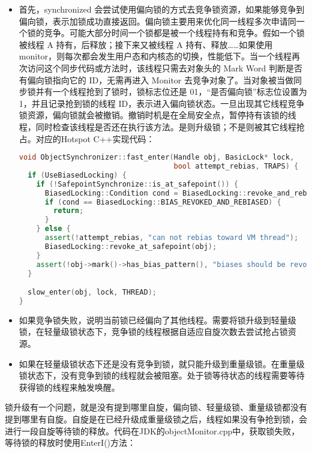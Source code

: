 \documentclass[../../../interview-questions.tex]{subfiles}
\begin{document}
\begin{itemize}
    \item {首先，synchronized 会尝试使用偏向锁的方式去竞争锁资源，如果能够竞争到偏向锁，表示加锁成功直接返回。偏向锁主要用来优化同一线程多次申请同一个锁的竞争。可能大部分时间一个锁都是被一个线程持有和竞争。假如一个锁被线程 A 持有，后释放；接下来又被线程 A 持有、释放……如果使用 monitor，则每次都会发生用户态和内核态的切换，性能低下。当一个线程再次访问这个同步代码或方法时，该线程只需去对象头的 Mark Word 判断是否有偏向锁指向它的 ID，无需再进入 Monitor 去竞争对象了。当对象被当做同步锁并有一个线程抢到了锁时，锁标志位还是 01，“是否偏向锁”标志位设置为 1，并且记录抢到锁的线程 ID，表示进入偏向锁状态。一旦出现其它线程竞争锁资源，偏向锁就会被撤销。撤销时机是在全局安全点，暂停持有该锁的线程，同时检查该线程是否还在执行该方法。是则升级锁；不是则被其它线程抢占。}对应的Hotspot C++实现代码：
    
\begin{lstlisting}[language=C++]
void ObjectSynchronizer::fast_enter(Handle obj, BasicLock* lock,
                                    bool attempt_rebias, TRAPS) {
  if (UseBiasedLocking) {
    if (!SafepointSynchronize::is_at_safepoint()) {
      BiasedLocking::Condition cond = BiasedLocking::revoke_and_rebias(obj, attempt_rebias, THREAD);
      if (cond == BiasedLocking::BIAS_REVOKED_AND_REBIASED) {
        return;
      }
    } else {
      assert(!attempt_rebias, "can not rebias toward VM thread");
      BiasedLocking::revoke_at_safepoint(obj);
    }
    assert(!obj->mark()->has_bias_pattern(), "biases should be revoked by now");
  }

  slow_enter(obj, lock, THREAD);
}
\end{lstlisting}


    \item {如果竞争锁失败，说明当前锁已经偏向了其他线程。需要将锁升级到轻量级锁，在轻量级锁状态下，竞争锁的线程根据自适应自旋次数去尝试抢占锁资源。}
    \item {如果在轻量级锁状态下还是没有竞争到锁，就只能升级到重量级锁。在重量级锁状态下，没有竞争到锁的线程就会被阻塞。处于锁等待状态的线程需要等待获得锁的线程来触发唤醒。}
\end{itemize}

锁升级有一个问题，就是没有提到哪里自旋，偏向锁、轻量级锁、重量级锁都没有提到哪里有自旋。自旋是在已经升级成重量级锁之后，线程如果没有争抢到锁，会进行一段自旋等待锁的释放。代码在JDK的objectMonitor.cpp中，获取锁失败，等待锁的释放时使用EnterI()方法：
\end{document}
